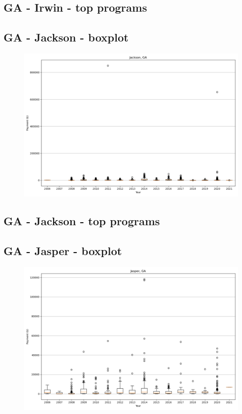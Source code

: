 \subsection*{GA - Irwin - top programs}

\newpage
\subsection*{GA - Jackson - boxplot}
\begin{figure}[h]
\centering
\includegraphics[width=7in]{../output/boxplots/counties/Jackson-GA_boxplot.png}
\end{figure}


\subsection*{GA - Jackson - top programs}

\newpage
\subsection*{GA - Jasper - boxplot}
\begin{figure}[h]
\centering
\includegraphics[width=7in]{../output/boxplots/counties/Jasper-GA_boxplot.png}
\end{figure}


